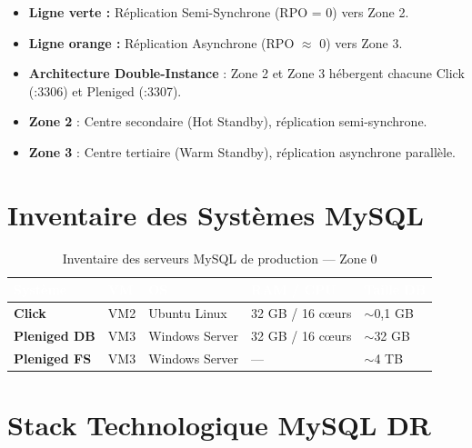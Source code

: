 \documentclass[a4paper,11pt]{article}
\newenvironment{infobox}[1][Information]{%
  \begin{tcolorbox}[colback=zoneblue, colframe=bnmlightblue, fonttitle=\bfseries, title=#1]
}{%
  \end{tcolorbox}
}
\begin{document}
\begin{infobox}[Lecture du Schéma]
\begin{itemize}[noitemsep]
  \item \textcolor{bnmgreen}{\textbf{Ligne verte :}} Réplication Semi-Synchrone (RPO = 0) vers Zone 2.
  \item \textcolor{bnmwarning}{\textbf{Ligne orange :}} Réplication Asynchrone (RPO $\approx$ 0) vers Zone 3.
  \item \textbf{Architecture Double-Instance} : Zone 2 et Zone 3 hébergent chacune Click (:3306) et Pleniged (:3307).
  \item \textbf{Zone 2} : Centre secondaire (Hot Standby), réplication semi-synchrone.
  \item \textbf{Zone 3} : Centre tertiaire (Warm Standby), réplication asynchrone parallèle.
\end{itemize}
\end{infobox}

\section{Inventaire des Systèmes MySQL}

\begin{table}[h!]
\centering
\renewcommand{\arraystretch}{1.4}
\begin{tabular}{|>{\bfseries}l|l|l|l|l|}
\hline
\rowcolor{bnmblue}\textcolor{white}{Système} & \textcolor{white}{VM} & \textcolor{white}{OS} & \textcolor{white}{RAM / CPU} & \textcolor{white}{Taille DB} \\
\hline
Click & VM2 & Ubuntu Linux & 32 GB / 16 cœurs & $\sim$0,1 GB \\
\hline
\rowcolor{bnmlightgray}
Pleniged DB & VM3 & Windows Server & 32 GB / 16 cœurs & $\sim$32 GB \\
\hline
Pleniged FS & VM3 & Windows Server & — & $\sim$4 TB \\
\hline
\end{tabular}
\caption{Inventaire des serveurs MySQL de production — Zone 0}
\end{table}

\section{Stack Technologique MySQL DR}
\end{document}
